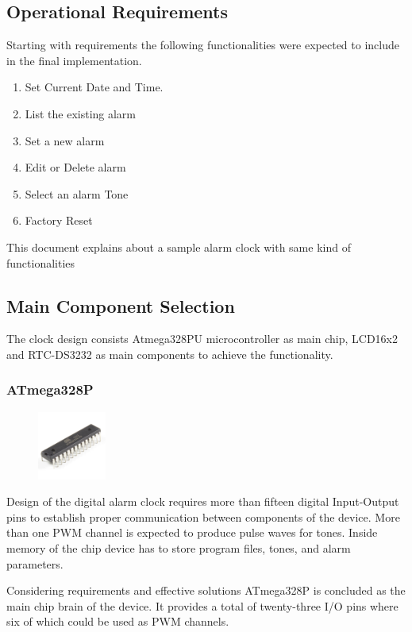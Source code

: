 \documentclass[12pt,twocolumn]{article}
\begin{document}
    \subsection{Operational Requirements}
Starting with requirements the following functionalities were expected to include in the final 
implementation.
\begin{enumerate}
    \item Set Current Date and Time.
    \item List the existing alarm
    \item Set a new alarm
    \item Edit or Delete alarm
    \item Select an alarm Tone
    \item Factory Reset
\end{enumerate}
This document explains about a sample alarm clock with same kind of functionalities ~\cite{sandilya2018design}


    \subsection{Main Component Selection}
The clock design consists Atmega328PU microcontroller as main chip, LCD16x2 and 
RTC-DS3232 as main components to achieve the functionality. 

        \subsubsection{ATmega328P}

\begin{figure}
    \includegraphics[width=0.2\textwidth]{chip}
\end{figure}

Design of the digital alarm clock requires more than fifteen digital Input-Output pins to establish
proper communication between components of the device. More than one PWM channel is expected to 
produce pulse waves for tones. Inside memory of the chip device has to store program files,
tones, and alarm parameters.

Considering requirements and effective solutions ATmega328P is concluded as the main chip brain of the 
device. It provides a total of twenty-three I/O pins where six of which could be used as PWM channels.
\end{document}
